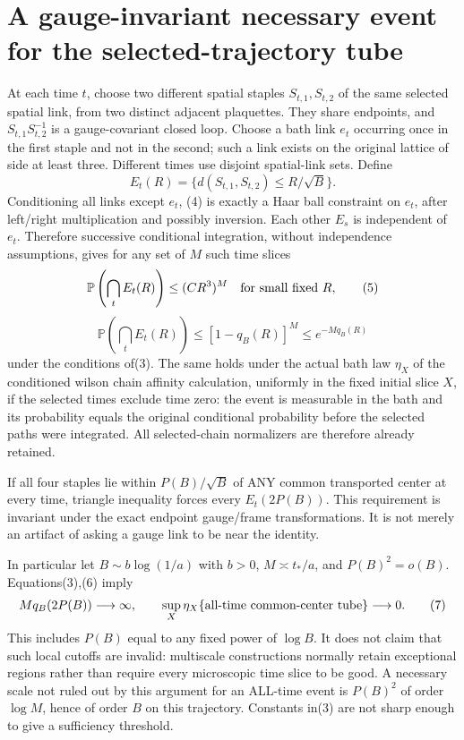 \documentclass{article}
\begin{document}
\section*{A gauge-invariant necessary event for the selected-trajectory tube}
At each time $t$, choose two different spatial staples $S_{t,1},S_{t,2}$ of the same selected spatial link, from two distinct adjacent plaquettes. They share endpoints, and $S_{t,1}S_{t,2}^{-1}$ is a gauge-covariant closed loop. Choose a bath link $e_t$ occurring once in the first staple and not in the second; such a link exists on the original lattice of side at least three. Different times use disjoint spatial-link sets. Define
\[
 E_t(R)=\{d(S_{t,1},S_{t,2})\le R/\sqrt B\}.           \tag{4}
\]
Conditioning all links except $e_t$, (4) is exactly a Haar ball constraint on $e_t$, after left/right multiplication and possibly inversion. Each other $E_s$ is independent of $e_t$. Therefore successive conditional integration, without independence assumptions, gives for any set of $M$ such time slices
\[
 \mathbb P\left(\bigcap_t E_t(R)\right)
 \le (CR^3)^M\quad\hbox{for small fixed }R,            \tag{5}
\]
\[
 \mathbb P\left(\bigcap_t E_t(R)\right)
 \le[1-q_B(R)]^M\le e^{-M q_B(R)}                    \tag{6}
\]
under the conditions of(3). The same holds under the actual bath law $\eta_X$ of the conditioned wilson chain affinity calculation, uniformly in the fixed initial slice $X$, if the selected times exclude time zero: the event is measurable in the bath and its probability equals the original conditional probability before the selected paths were integrated. All selected-chain normalizers are therefore already retained.

If all four staples lie within $P(B)/\sqrt B$ of ANY common transported center at every time, triangle inequality forces every $E_t(2P(B))$. This requirement is invariant under the exact endpoint gauge/frame transformations. It is not merely an artifact of asking a gauge link to be near the identity.

In particular let $B\sim b\log(1/a)$ with $b>0$, $M\asymp t_*/a$, and $P(B)^2=o(B)$. Equations(3),(6) imply
\[
 Mq_B(2P(B))\longrightarrow\infty,
 \qquad\sup_X\eta_X\{\hbox{all-time common-center tube}\}\longrightarrow0.           \tag{7}
\]
This includes $P(B)$ equal to any fixed power of $\log B$. It does not claim that such local cutoffs are invalid: multiscale constructions normally retain exceptional regions rather than require every microscopic time slice to be good. A necessary scale not ruled out by this argument for an ALL-time event is $P(B)^2$ of order $\log M$, hence of order $B$ on this trajectory. Constants in(3) are not sharp enough to give a sufficiency threshold.
\end{document}

